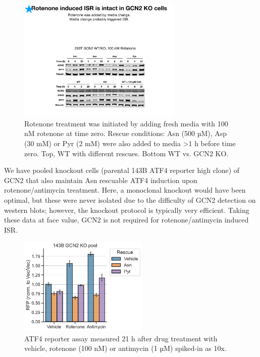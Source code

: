 \begin{figure}[ht]
    \centering
    \includegraphics[width=0.70\textwidth]{figures/sapp/ISR/293T_GCN2_ISR.pdf}
    \caption[ATF4 post mito inhib. GCN2 KO, western.]{
    Rotenone treatment was initiated by adding fresh media with 100 nM rotenone at time zero.
    Rescue conditions: Asn (500 µM), Asp (30 mM) or Pyr (2 mM) were also added to media >1 h before time zero.
    Top, WT with different rescues.
    Bottom WT vs. GCN2 KO.
    }
    \label{fig:sapp:ISR:293T_GCN2_ISR}
\end{figure}


\FloatBarrier
We have pooled knockout cells (parental 143B ATF4 reporter high clone) of GCN2 that also maintain Asn rescuable ATF4 induction upon rotenone/antimycin treatment.
Here, a monoclonal knockout would have been optimal, but these were never isolated due to the difficulty of GCN2 detection on western blots; however, the knockout protocol is typically very efficient.
Taking these data at face value, GCN2 is not required for rotenone/antimycin induced ISR.

\begin{figure}[ht]
    \centering
    \includegraphics[width=0.55\textwidth]{figures/sapp/ISR/143B_GCN2_ISR.pdf}
    \caption[ATF4 post mito inhib. GCN2 KO, reporter.]{
    ATF4 reporter assay measured 21 h after drug treatment with vehicle, rotenone (100 nM) or antimycin (1 µM) spiked-in as 10x.
    }
    \label{fig:sapp:ISR:143B_GCN2_ISR}
\end{figure}


